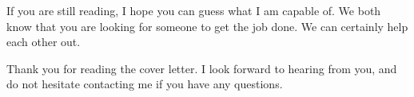 \documentclass[11pt,a4paper,roman]{moderncv}
\begin{document}
 If you are still reading, I hope you can guess what I am capable of. We both know that you are looking for 
 someone to get the job done. We can certainly help each other out.



Thank you for reading the cover letter. I look forward to hearing from you, and do not hesitate contacting me if you have any questions.

\vspace{0.5cm}


\makeletterclosing
\end{document}
